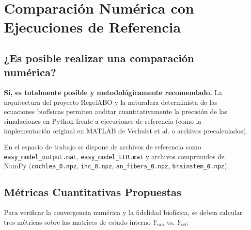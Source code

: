 \documentclass[12pt,a4paper]{article}
\begin{document}
\section{Comparación Numérica con Ejecuciones de Referencia}

\subsection{¿Es posible realizar una comparación numérica?}
\textbf{Sí, es totalmente posible y metodológicamente recomendado.} La arquitectura del proyecto RegelABO y la naturaleza determinista de las ecuaciones biofísicas permiten auditar cuantitativamente la precisión de las simulaciones en Python frente a ejecuciones de referencia (como la implementación original en MATLAB de Verhulst et al. o archivos precalculados).

En el espacio de trabajo se dispone de archivos de referencia como \texttt{easy\_model\_output.mat}, \texttt{easy\_model\_EFR.mat} y archivos comprimidos de NumPy (\texttt{cochlea\_0.npz}, \texttt{ihc\_0.npz}, \texttt{an\_fibers\_0.npz}, \texttt{brainstem\_0.npz}).

\subsection{Métricas Cuantitativas Propuestas}
Para verificar la convergencia numérica y la fidelidad biofísica, se deben calcular tres métricas sobre las matrices de estado interno $Y_{\text{sim}}$ vs. $Y_{\text{ref}}$:
\end{document}
